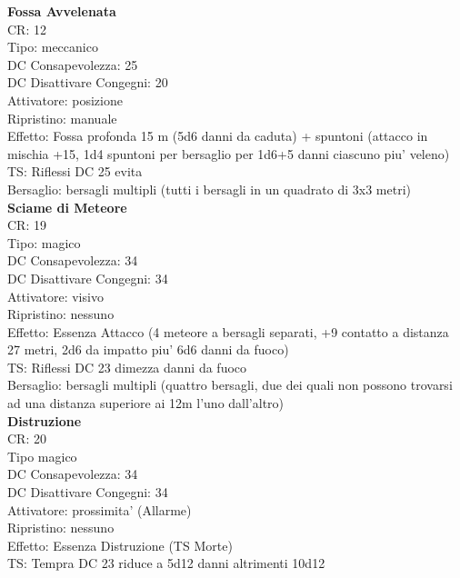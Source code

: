 \documentclass[a4paper,11pt,twoside,openany]{book}
\begin{document}
{\begin{multicols}{2}
			\textbf{Fossa Avvelenata}\\
			CR: 12 \\
			Tipo: meccanico \\
			DC Consapevolezza: 25 \\
			DC Disattivare Congegni: 20 \\
			Attivatore: posizione \\
			Ripristino: manuale \\
			Effetto: Fossa profonda 15 m (5d6 danni da caduta) + spuntoni (attacco in mischia +15, 1d4 spuntoni per bersaglio per 1d6+5 danni ciascuno piu' veleno)\\
			TS: Riflessi DC 25 evita \\
			Bersaglio: bersagli multipli (tutti i bersagli in un quadrato di 3x3 metri)\\
			
			\textbf{Sciame di Meteore}\\
			CR: 19 \\
			Tipo: magico \\
			DC Consapevolezza: 34 \\
			DC Disattivare Congegni: 34 \\
			Attivatore: visivo\\
			Ripristino: nessuno \\
			Effetto: Essenza Attacco (4 meteore a bersagli separati, +9 contatto a distanza 27 metri, 2d6 da impatto piu' 6d6 danni da fuoco)\\
			TS: Riflessi DC 23 dimezza danni da fuoco\\
			Bersaglio: bersagli multipli (quattro bersagli, due dei quali non possono trovarsi ad una distanza superiore ai 12m l’uno dall’altro)\\
			
			\textbf{Distruzione}\\
			CR: 20 \\
			Tipo magico \\
			DC Consapevolezza: 34 \\
			DC Disattivare Congegni: 34 \\
			Attivatore: prossimita' (Allarme) \\
			Ripristino: nessuno \\
			Effetto: Essenza Distruzione (TS Morte)\\
			TS: Tempra DC 23 riduce a 5d12 danni altrimenti 10d12\\
			
		\end{multicols}
		
}
\end{document}
